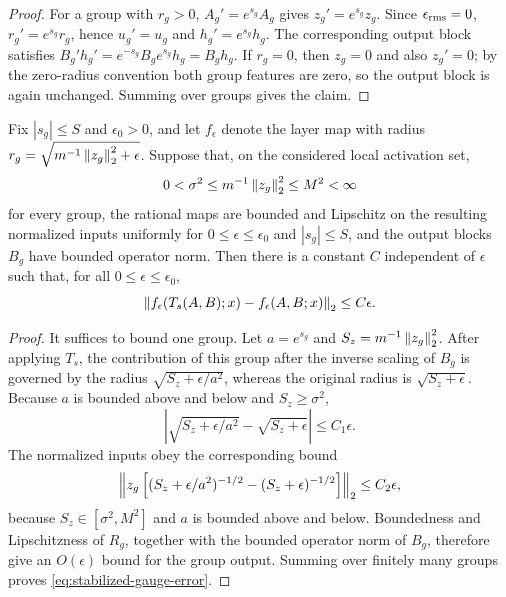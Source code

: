 \begin{proof}
For a group with $r_g>0$, $A_g'=e^{s_g}A_g$ gives $z_g'=e^{s_g}z_g$.  Since
$\epsilon_{\rm rms}=0$, $r_g'=e^{s_g}r_g$, hence $u_g'=u_g$ and
$h_g'=e^{s_g}h_g$.  The corresponding output block satisfies
$B_g'h_g'=e^{-s_g}B_g e^{s_g}h_g=B_gh_g$.  If $r_g=0$, then $z_g=0$ and also
$z_g'=0$; by the zero-radius convention both group features are zero, so the output
block is again unchanged.  Summing over groups gives the claim.
\end{proof}

\begin{proposition}
\label{prop:stabilized-gauge-error}
Fix $|s_g|\leq S$ and $\epsilon_0>0$, and let $f_\epsilon$ denote the layer map with
radius $r_g=\sqrt{m^{-1}\left\lVert z_g \right\rVert_2^2+\epsilon}$.  Suppose that, on the considered
local activation set,
\begin{equation}
    0<\sigma^2\leq m^{-1}\left\lVert z_g \right\rVert_2^2\leq M^2<\infty
\end{equation}
for every group, the rational maps are bounded and Lipschitz on the resulting normalized
inputs uniformly for $0\leq\epsilon\leq\epsilon_0$ and $|s_g|\leq S$, and the output
blocks $B_g$ have bounded operator norm.  Then there is a constant $C$ independent of
$\epsilon$ such that, for all $0\leq\epsilon\leq\epsilon_0$,
\begin{equation}
    \left\lVert f_\epsilon(T_s(A,B);x)-f_\epsilon(A,B;x) \right\rVert_2\leq C\epsilon .
    \label{eq:stabilized-gauge-error}
\end{equation}
\end{proposition}

\begin{proof}
It suffices to bound one group.  Let $a=e^{s_g}$ and
$S_z=m^{-1}\left\lVert z_g \right\rVert_2^2$.  After applying $T_s$, the contribution of this group after
the inverse scaling of $B_g$ is governed by the radius
$\sqrt{S_z+\epsilon/a^2}$, whereas the original radius is $\sqrt{S_z+\epsilon}$.
Because $a$ is bounded above and below and $S_z\geq\sigma^2$,
\begin{equation}
    \left|\sqrt{S_z+\epsilon/a^2}-\sqrt{S_z+\epsilon}\right|\leq C_1\epsilon .
\end{equation}
The normalized inputs obey the corresponding bound
\begin{equation}
    \left\lVert z_g\left[(S_z+\epsilon/a^2)^{-1/2}-(S_z+\epsilon)^{-1/2}\right] \right\rVert_2
    \leq C_2\epsilon,
\end{equation}
because $S_z\in[\sigma^2,M^2]$ and $a$ is bounded above and below.  Boundedness and
Lipschitzness of $R_g$, together with the bounded operator norm of $B_g$, therefore give
an $O(\epsilon)$ bound for the group output.
Summing over finitely many groups proves \eqref{eq:stabilized-gauge-error}.
\end{proof}

